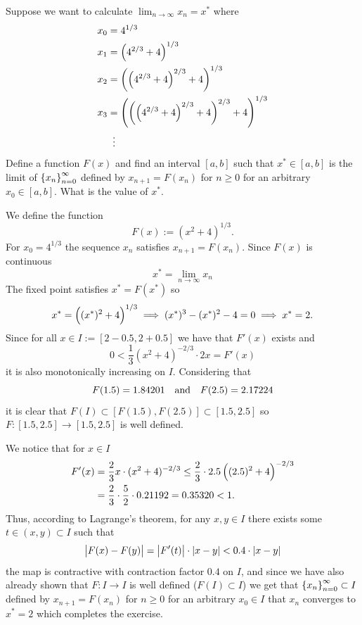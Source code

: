 \documentclass[11pt, a4paper]{article}
\begin{document}
\begin{exercise}
  Suppose we want to calculate $\lim_{n \to \infty} x_n = x^*$ where
  \begin{align*}
    x_0 &= 4^{1/3} \\
    x_1 &= \del{4^{2/3} + 4}^{1/3} \\
    x_2 &= \del{\del{4^{2/3} + 4}^{2/3} + 4}^{1/3} \\
    x_3 &= \del{\del{\del{4^{2/3} + 4}^{2/3} + 4}^{2/3} + 4}^{1/3} \\
        &\vdotswithin{=}
  \end{align*}
  Define a function $F(x)$ and find an interval $[a,b]$ such that
  $x^* \in [a,b]$ is the limit of $\left\{x_n\right\}_{n=0}^{\infty}$ defined by
  $x_{n+1} = F(x_n)$ for $n \geq 0$ for an arbitrary $x_0 \in [a,b]$.
  What is the value of $x^*$.
\end{exercise}
\begin{solution}
  We define the function
  \[
    F(x) := (x^2 + 4)^{1/3}.
  \]
  For $x_0 = 4^{1/3}$ the sequence $x_n$ satisfies $x_{n+1} = F(x_n)$.
  Since $F(x)$ is continuous
  \[
    x^* = \lim_{n \to \infty} x_n
  \]
  The fixed point satisfies $x^* = F(x^*)$ so
  \[
    x^* = \del{(x^*)^2 + 4}^{1/3} \implies
    (x^*)^3 - (x^*)^2 - 4 = 0 \implies
    x^* = 2.
  \]
  Since for all $x \in I := [2 - 0.5, 2 + 0.5]$ we have that $F'(x)$ exists and
  \[
    0 < \frac{1}{3} (x^2 + 4)^{-2/3} \cdot 2x = F'(x)
  \]
  it is also monotonically increasing on $I$.
  Considering that
  \[
    F(1.5) = 1.84201 \quad \text{and} \quad
    F(2.5) = 2.17224
  \]
  it is clear that $F(I) \subset [F(1.5),F(2.5)] \subset [1.5,2.5]$ so
  $F \colon [1.5,2.5] \to [1.5,2.5]$ is well defined.

  We notice that for $x \in I$
  \begin{align*}
    F'(x) &= \frac{2}{3} x \cdot (x^2 + 4)^{-2/3}
    \le \frac{2}{3} \cdot 2.5 \del{(2.5)^2 + 4}^{-2/3} \\ &=
    \frac{2}{3} \cdot \frac{5}{2} \cdot 0.21192 =
    0.35320 < 1.
  \end{align*}
  Thus, according to Lagrange's theorem, for any $x,y \in I$ there exists
  some $t \in (x,y) \subset I$ such that
  \[
    \left\lvert F(x) - F(y)\right\rvert =
    \left\lvert F'(t)\right\rvert \cdot \left\lvert x - y\right\rvert <
    0.4 \cdot \left\lvert x - y\right\rvert
  \]
  the map is contractive with contraction factor $0.4$ on $I$, and since
  we have also already shown that $F \colon I \to I$ is well defined
  ($F(I) \subset I$) we get that $\left\{x_n\right\}_{n=0}^{\infty} \subset I$ defined by
  $x_{n+1} = F(x_n)$ for $n \geq 0$ for an arbitrary $x_0 \in I$ that
  $x_n$ converges to $x^* = 2$ which completes the exercise.
\end{solution}
\end{document}
